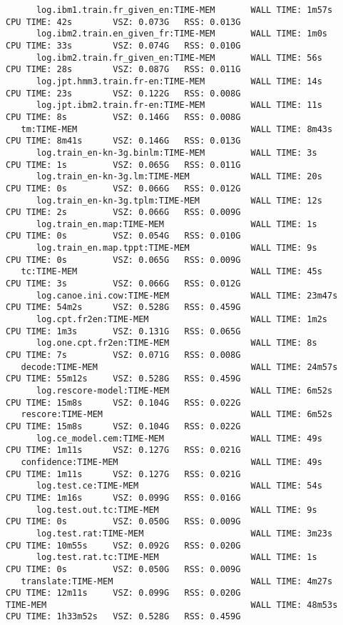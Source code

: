\documentclass[11pt,letterpaper]{article}
\begin{document}
\begin{sidewaysfigure}
\begin{footnotesize}
\begin{verbatim}
      log.ibm1.train.fr_given_en:TIME-MEM       WALL TIME: 1m57s    CPU TIME: 42s        VSZ: 0.073G   RSS: 0.013G
      log.ibm2.train.en_given_fr:TIME-MEM       WALL TIME: 1m0s     CPU TIME: 33s        VSZ: 0.074G   RSS: 0.010G
      log.ibm2.train.fr_given_en:TIME-MEM       WALL TIME: 56s      CPU TIME: 28s        VSZ: 0.087G   RSS: 0.011G
      log.jpt.hmm3.train.fr-en:TIME-MEM         WALL TIME: 14s      CPU TIME: 23s        VSZ: 0.122G   RSS: 0.008G
      log.jpt.ibm2.train.fr-en:TIME-MEM         WALL TIME: 11s      CPU TIME: 8s         VSZ: 0.146G   RSS: 0.008G
   tm:TIME-MEM                                  WALL TIME: 8m43s    CPU TIME: 8m41s      VSZ: 0.146G   RSS: 0.013G
      log.train_en-kn-3g.binlm:TIME-MEM         WALL TIME: 3s       CPU TIME: 1s         VSZ: 0.065G   RSS: 0.011G
      log.train_en-kn-3g.lm:TIME-MEM            WALL TIME: 20s      CPU TIME: 0s         VSZ: 0.066G   RSS: 0.012G
      log.train_en-kn-3g.tplm:TIME-MEM          WALL TIME: 12s      CPU TIME: 2s         VSZ: 0.066G   RSS: 0.009G
      log.train_en.map:TIME-MEM                 WALL TIME: 1s       CPU TIME: 0s         VSZ: 0.054G   RSS: 0.010G
      log.train_en.map.tppt:TIME-MEM            WALL TIME: 9s       CPU TIME: 0s         VSZ: 0.065G   RSS: 0.009G
   tc:TIME-MEM                                  WALL TIME: 45s      CPU TIME: 3s         VSZ: 0.066G   RSS: 0.012G
      log.canoe.ini.cow:TIME-MEM                WALL TIME: 23m47s   CPU TIME: 54m2s      VSZ: 0.528G   RSS: 0.459G
      log.cpt.fr2en:TIME-MEM                    WALL TIME: 1m2s     CPU TIME: 1m3s       VSZ: 0.131G   RSS: 0.065G
      log.one.cpt.fr2en:TIME-MEM                WALL TIME: 8s       CPU TIME: 7s         VSZ: 0.071G   RSS: 0.008G
   decode:TIME-MEM                              WALL TIME: 24m57s   CPU TIME: 55m12s     VSZ: 0.528G   RSS: 0.459G
      log.rescore-model:TIME-MEM                WALL TIME: 6m52s    CPU TIME: 15m8s      VSZ: 0.104G   RSS: 0.022G
   rescore:TIME-MEM                             WALL TIME: 6m52s    CPU TIME: 15m8s      VSZ: 0.104G   RSS: 0.022G
      log.ce_model.cem:TIME-MEM                 WALL TIME: 49s      CPU TIME: 1m11s      VSZ: 0.127G   RSS: 0.021G
   confidence:TIME-MEM                          WALL TIME: 49s      CPU TIME: 1m11s      VSZ: 0.127G   RSS: 0.021G
      log.test.ce:TIME-MEM                      WALL TIME: 54s      CPU TIME: 1m16s      VSZ: 0.099G   RSS: 0.016G
      log.test.out.tc:TIME-MEM                  WALL TIME: 9s       CPU TIME: 0s         VSZ: 0.050G   RSS: 0.009G
      log.test.rat:TIME-MEM                     WALL TIME: 3m23s    CPU TIME: 10m55s     VSZ: 0.092G   RSS: 0.020G
      log.test.rat.tc:TIME-MEM                  WALL TIME: 1s       CPU TIME: 0s         VSZ: 0.050G   RSS: 0.009G
   translate:TIME-MEM                           WALL TIME: 4m27s    CPU TIME: 12m11s     VSZ: 0.099G   RSS: 0.020G
TIME-MEM                                        WALL TIME: 48m53s   CPU TIME: 1h33m52s   VSZ: 0.528G   RSS: 0.459G
\end{verbatim}
\end{footnotesize}
\end{sidewaysfigure}
\end{document}
